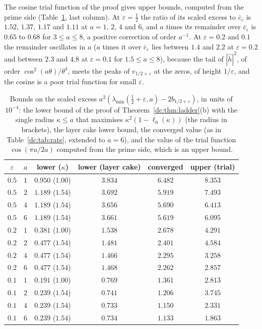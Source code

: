 The cosine trial function of the proof gives upper bounds, computed from the prime side (Table~\ref{dc:tab:bracket}, last column). At $\varepsilon=\frac12$ the ratio of its scaled excess to $\bar c_\varepsilon$ is $1.52$, $1.37$, $1.17$ and $1.11$ at $a=1$, $2$, $4$ and $6$, and $a$ times its remainder over $\bar c_\varepsilon$ is $0.65$ to $0.68$ for $3\le a\le8$, a positive correction of order $a^{-1}$. At $\varepsilon=0.2$ and $0.1$ the remainder oscillates in $a$ ($a$ times it over $\bar c_\varepsilon$ lies between $1.4$ and $2.2$ at $\varepsilon=0.2$ and between $2.3$ and $4.8$ at $\varepsilon=0.1$ for $1.5\le a\le8$), because the tail of $|\hat h|^2$, of order $\cos^2(a\theta)/\theta^4$, meets the peaks of $v_{1/2+\varepsilon}$ at the zeros, of height $1/\varepsilon$, and the cosine is a poor trial function for small $\varepsilon$.

\begin{table}[ht]
\centering\small
\setlength{\tabcolsep}{4pt}
\begin{tabular}{@{}cccccc@{}}
\toprule
$\varepsilon$ & $a$ & lower ($\kappa$) & lower (layer cake) & converged & upper (trial)\\
\midrule
$0.5$ & $1$ & $0.950$ ($1.00$) & $3.834$ & $6.482$ & $8.353$\\
$0.5$ & $2$ & $1.189$ ($1.54$) & $3.692$ & $5.919$ & $7.493$\\
$0.5$ & $4$ & $1.189$ ($1.54$) & $3.656$ & $5.690$ & $6.413$\\
$0.5$ & $6$ & $1.189$ ($1.54$) & $3.661$ & $5.619$ & $6.095$\\
\midrule
$0.2$ & $1$ & $0.381$ ($1.00$) & $1.538$ & $2.678$ & $4.291$\\
$0.2$ & $2$ & $0.477$ ($1.54$) & $1.481$ & $2.401$ & $4.584$\\
$0.2$ & $4$ & $0.477$ ($1.54$) & $1.466$ & $2.295$ & $3.258$\\
$0.2$ & $6$ & $0.477$ ($1.54$) & $1.468$ & $2.262$ & $2.857$\\
\midrule
$0.1$ & $1$ & $0.191$ ($1.00$) & $0.769$ & $1.361$ & $2.813$\\
$0.1$ & $2$ & $0.239$ ($1.54$) & $0.741$ & $1.206$ & $3.745$\\
$0.1$ & $4$ & $0.239$ ($1.54$) & $0.733$ & $1.150$ & $2.331$\\
$0.1$ & $6$ & $0.239$ ($1.54$) & $0.734$ & $1.133$ & $1.863$\\
\bottomrule
\end{tabular}
\caption{Bounds on the scaled excess $a^2(\lambda_{\min}(\frac12+\varepsilon,a)-2b_{1/2+\varepsilon})$, in units of $10^{-4}$: the lower bound of the proof of Theorem~\ref{dc:thm:ladder}(b) with the single radius $\kappa\le a$ that maximises $\kappa^2(1-\ell_0(\kappa))$ (the radius in brackets), the layer cake lower bound, the converged value (as in Table~\ref{dc:tab:rate}, extended to $a=6$), and the value of the trial function $\cos(\pi u/2a)$ computed from the prime side, which is an upper bound.}
\label{dc:tab:bracket}
\end{table}
